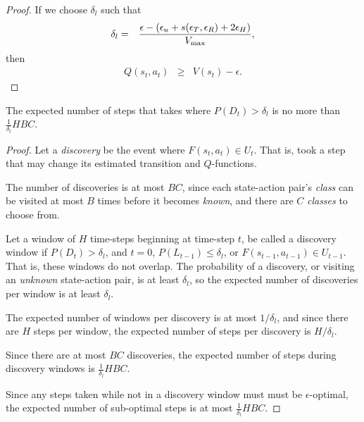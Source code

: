 \begin{proof}
If we choose $\delta_l$ such that
\begin{eqnarray}
\delta_l &=& \frac {\epsilon - (\epsilon_u + s(\epsilon_T,\epsilon_R) +2 \epsilon_H)} {V_{\rm max}},
\end{eqnarray}
then 
\begin{eqnarray}
Q(s_t,a_t) &\geq& V(s_t) - \epsilon.
\end{eqnarray}

\end{proof}

\begin{lemma}
\label{sec:pacmdp:lemma:bad-steps}
The expected number of steps that \A takes where $P(D_t) > \delta_l$ is no more than $\frac 1 {\delta_l} H B C$.
\end{lemma}

\begin{proof}
Let a \emph{discovery} be the event where $F(s_t,a_t) \in U_t$. That is, \A took a step that may change its estimated transition and $Q$-functions.

The number of discoveries is at most $B C$, since each state-action pair's \emph{class} can be visited at most $B$ times before it becomes \emph{known}, and there are $C$ \emph{classes} to choose from.

Let a window of $H$ time-steps beginning at time-step $t$, be called a discovery window if $P(D_t) > \delta_l$, and $t=0$, $P(L_{t-1}) \leq \delta_l$, or $F(s_{t-1},a_{t-1}) \in U_{t-1}$. That is, these windows do not overlap. The probability of a discovery, or visiting an \emph{unknown} state-action pair, is at least $\delta_l$, so the expected number of discoveries per window is at least $\delta_l$.

The expected number of windows per discovery is at most $1/\delta_l$, and since there are $H$ steps per window, the expected number of steps per discovery is $H / \delta_l$.

Since there are at most $B C$ discoveries, the expected number of steps during discovery windows is $\frac 1 {\delta_l} H B C$.

Since any steps taken while not in a discovery window must must be $\epsilon$-optimal, the expected number of sub-optimal steps is at most $\frac 1 {\delta_l} H B C$.

\end{proof}
